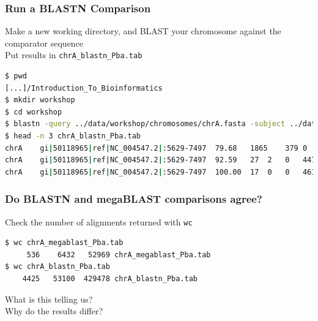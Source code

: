 \documentclass[table]{beamer}
\begin{document}
  \begin{frame}[fragile]
    \frametitle{Run a BLASTN Comparison}
    Make a new working directory, and BLAST your chromosome against the comparator sequence \\
    Put results in \texttt{chrA\_blastn\_Pba.tab}
    \begin{lstlisting}[language=bash]
$ pwd
[...]/Introduction_To_Bioinformatics
$ mkdir workshop
$ cd workshop
$ blastn -query ../data/workshop/chromosomes/chrA.fasta -subject ../data/workshop/chromosomes/NC_004547.ffn -out chrA_blastn_Pba.tab -outfmt 6 -task blastn
$ head -n 3 chrA_blastn_Pba.tab 
chrA	gi|50118965|ref|NC_004547.2|:5629-7497	79.68	1865	379	0	4584915	4586779	1865	1	0.0	1654
chrA	gi|50118965|ref|NC_004547.2|:5629-7497	92.59	27	2	0	4479367	4479393	1254	1280	0.004	41.0
chrA	gi|50118965|ref|NC_004547.2|:5629-7497	100.00	17	0	0	4613022	4613038	52	36	2.1	31.9
    \end{lstlisting}
\end{frame}     
    
  \begin{frame}[fragile]
    \frametitle{Do BLASTN and megaBLAST comparisons agree?}
    Check the number of alignments returned with \texttt{wc}
    \begin{lstlisting}[language=bash]
$ wc chrA_megablast_Pba.tab 
     536    6432   52969 chrA_megablast_Pba.tab
$ wc chrA_blastn_Pba.tab 
    4425   53100  429478 chrA_blastn_Pba.tab
    \end{lstlisting}
    What is this telling us? \\
    Why do the results differ?
\end{frame}         
\end{document}
